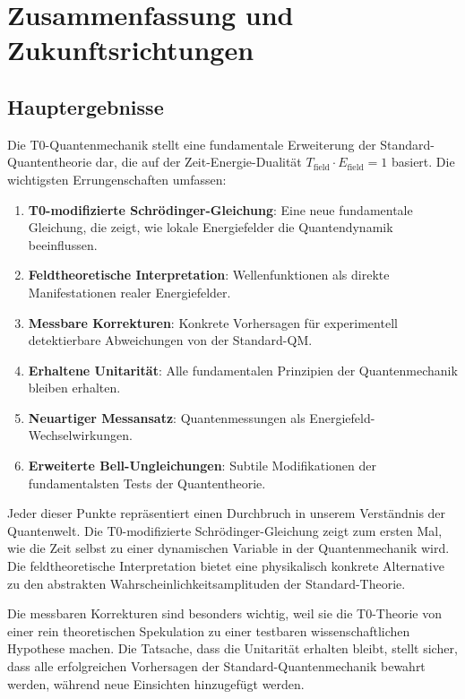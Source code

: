 \documentclass[12pt,a4paper]{article}
\theoremstyle{definition}
\theoremstyle{remark}
\begin{document}
\section{Zusammenfassung und Zukunftsrichtungen}

\subsection{Hauptergebnisse}

Die T0-Quantenmechanik stellt eine fundamentale Erweiterung der Standard-Quantentheorie dar, die auf der Zeit-Energie-Dualität $T_{\text{field}} \cdot E_{\text{field}} = 1$ basiert. Die wichtigsten Errungenschaften umfassen:

\begin{enumerate}
	\item \textbf{T0-modifizierte Schrödinger-Gleichung}: Eine neue fundamentale Gleichung, die zeigt, wie lokale Energiefelder die Quantendynamik beeinflussen.
	\item \textbf{Feldtheoretische Interpretation}: Wellenfunktionen als direkte Manifestationen realer Energiefelder.
	\item \textbf{Messbare Korrekturen}: Konkrete Vorhersagen für experimentell detektierbare Abweichungen von der Standard-QM.
	\item \textbf{Erhaltene Unitarität}: Alle fundamentalen Prinzipien der Quantenmechanik bleiben erhalten.
	\item \textbf{Neuartiger Messansatz}: Quantenmessungen als Energiefeld-Wechselwirkungen.
	\item \textbf{Erweiterte Bell-Ungleichungen}: Subtile Modifikationen der fundamentalsten Tests der Quantentheorie.
\end{enumerate}

Jeder dieser Punkte repräsentiert einen Durchbruch in unserem Verständnis der Quantenwelt. Die T0-modifizierte Schrödinger-Gleichung zeigt zum ersten Mal, wie die Zeit selbst zu einer dynamischen Variable in der Quantenmechanik wird. Die feldtheoretische Interpretation bietet eine physikalisch konkrete Alternative zu den abstrakten Wahrscheinlichkeitsamplituden der Standard-Theorie.

Die messbaren Korrekturen sind besonders wichtig, weil sie die T0-Theorie von einer rein theoretischen Spekulation zu einer testbaren wissenschaftlichen Hypothese machen. Die Tatsache, dass die Unitarität erhalten bleibt, stellt sicher, dass alle erfolgreichen Vorhersagen der Standard-Quantenmechanik bewahrt werden, während neue Einsichten hinzugefügt werden.
\end{document}
